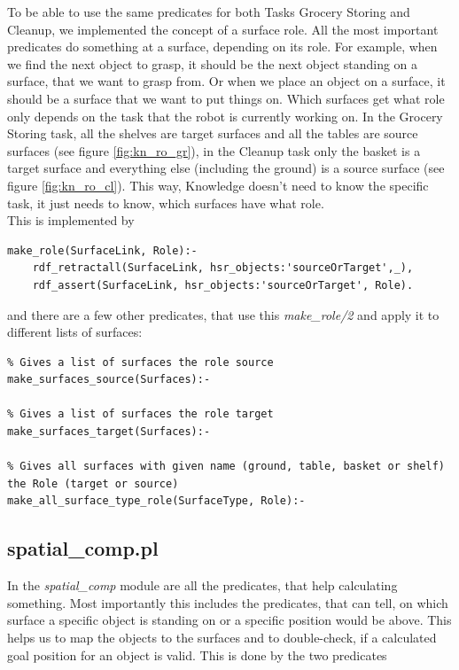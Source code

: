 \documentclass[main.tex]{subfiles}
\begin{document}
To be able to use the same predicates for both Tasks Grocery Storing and Cleanup, we implemented the concept of a surface role. All the most important predicates do something at a surface, depending on its role. For example, when we find the next object to grasp, it should be the next object standing on a surface, that we want to grasp from. Or when we place an object on a surface, it should be a surface that we want to put things on. Which surfaces get what role only depends on the task that the robot is currently working on. In the Grocery Storing task, all the shelves are target surfaces and all the tables are source surfaces (see figure \ref{fig:kn_ro_gr}), in the Cleanup task only the basket is a target surface and everything else (including the ground) is a source surface (see figure \ref{fig:kn_ro_cl}). This way, Knowledge doesn't need to know the specific task, it just needs to know, which surfaces have what role.\\
This is implemented by 

\begin{lstlisting}
make_role(SurfaceLink, Role):-
    rdf_retractall(SurfaceLink, hsr_objects:'sourceOrTarget',_),
    rdf_assert(SurfaceLink, hsr_objects:'sourceOrTarget', Role).
\end{lstlisting}
and there are a few other predicates, that use this \textit{make\_role/2} and apply it to different lists of surfaces:
\begin{lstlisting}
% Gives a list of surfaces the role source
make_surfaces_source(Surfaces):-

% Gives a list of surfaces the role target
make_surfaces_target(Surfaces):-

% Gives all surfaces with given name (ground, table, basket or shelf) the Role (target or source)
make_all_surface_type_role(SurfaceType, Role):-
\end{lstlisting}


\subsection{spatial\_comp.pl}

In the \textit{spatial\_comp} module are all the predicates, that help calculating something. Most importantly this includes the predicates, that can tell, on which surface a specific object is standing on or a specific position would be above. This helps us to map the objects to the surfaces and to double-check, if a calculated goal position for an object is valid. This is done by the two predicates
\end{document}
